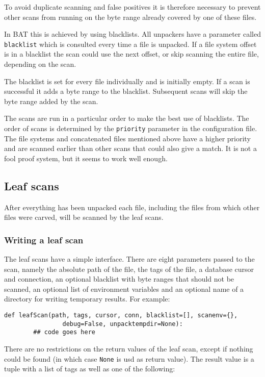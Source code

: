 \documentclass[10pt,a4paper]{article}
\begin{document}
To avoid duplicate scanning and false positives it is therefore necessary to
prevent other scans from running on the byte range already covered by one of
these files.

In BAT this is achieved by using blacklists. All unpackers have a parameter
called \texttt{blacklist} which is consulted every time a file is unpacked. If
a file system offset is in a blacklist the scan could use the next offset, or
skip scanning the entire file, depending on the scan.

The blacklist is set for every file individually and is initially empty. If a
scan is successful it adds a byte range to the blacklist. Subsequent scans
will skip the byte range added by the scan.

The scans are run in a particular order to make the best use of blacklists. The
order of scans is determined by the \texttt{priority} parameter in the
configuration file. The file systems and concatenated files mentioned above
have a higher priority and are scanned earlier than other scans that could also
give a match. It is not a fool proof system, but it seems to work well enough.

\subsection{Leaf scans}

After everything has been unpacked each file, including the files from which
other files were carved, will be scanned by the leaf scans.

\subsubsection{Writing a leaf scan}

The leaf scans have a simple interface. There are eight parameters passed to the
scan, namely the absolute path of the file, the tags of the file, a database
cursor and connection, an optional blacklist with byte ranges that should not
be scanned, an optional list of environment variables and an optional name of a
directory for writing temporary results. For example:

\begin{verbatim}
def leafScan(path, tags, cursor, conn, blacklist=[], scanenv={},
                debug=False, unpacktempdir=None):
        ## code goes here
\end{verbatim}

There are no restrictions on the return values of the leaf scan, except if
nothing could be found (in which case \texttt{None} is usd as return value).
The result value is a tuple with a list of tags as well as one of the following:
\end{document}
